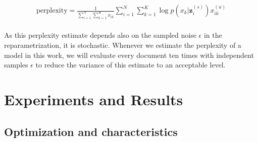 \documentclass{report}
\begin{document}
	
	\begin{align}
	\text{perplexity} =  \frac{1}{\sum\limits_{i=1}^{N}\sum\limits_{k=1}^{K}x_{ik}}\sum\limits_{i=1}^N\sum\limits_{k=1}^{K} \log p(x_{k}|\mathbf{z}_{i}^{(s)})x_{ik}^{(u)}
	\end{align}\\
	
	As this perplexity estimate depends also on the sampled noise $\epsilon$ in the reparametrization, it is stochastic. Whenever we estimate the perplexity of a model in this work, we will evaluate every document ten times with independent samples $\epsilon$ to reduce the variance of this estimate to an acceptable level.
	
	\section{Experiments and Results}
	
	
	\subsection{Optimization and characteristics}\label{exp1}
	
\end{document}
